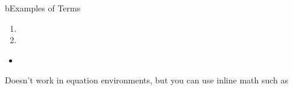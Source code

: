 \begin{myslide}{b}{Examples of Terms }

 \lipsum[1][1-2]  \lipsum[1][3]

\begin{theorem}

\lipsum[1][3] 

\end{theorem}

\begin{enumerate}
\item {}
\item {}
\end{enumerate}

\begin{itemize}
\item
\begin{myremark}
\end{myremark}
\end{itemize}

Doesn't work in equation environments, but you can use inline math such as 

\end{myslide}